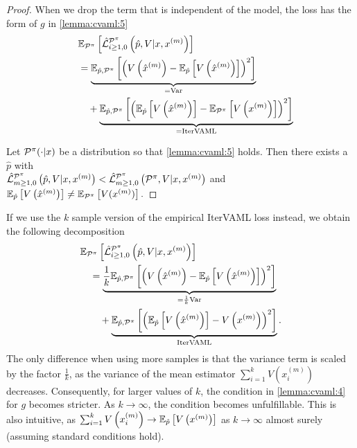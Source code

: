 \begin{proof}
When we drop the term that is independent of the model, the loss has the form of $g$ in \autoref{lemma:cvaml:5}
\begin{align}
   & \EEX{\P^\pi}{\hat{\mathcal{L}}^{\P^\pi}_{i\geq1,0}\left(\hat{p},V|x,x^{(m)}\right)} \\
   \quad & =  \underbrace{\EEX{\hat{p},\P^\pi}{\left(V\left(\hat{x}^{(m)}\right) - \EEX{\hat{p}}{V\left(\hat{x}^{(m)}\right)}\right)^2}}_{= \mathrm{Var}}  \\
   \quad & \quad +\underbrace{\EEX{\hat{p},\P^\pi}{\left(\EEX{\hat{p}}{V\left(\hat{x}^{(m)}\right)} - \EEX{\P^\pi}{V\left(x^{(m)}\right)}\right)^2}}_{= \mathrm{IterVAML}}
\end{align}

Let $\P^\pi(\cdot|x)$ be a distribution so that \autoref{lemma:cvaml:5} holds. 
Then there exists a $\hat{p}$ with \\$\hat{\mathcal{L}}^{\P^\pi}_{m\geq1,0}\left(\hat{p},V|x,x^{(m)}\right) < \hat{\mathcal{L}}^{\P^\pi}_{m\geq1,0}\left(\P^\pi,V|x,x^{(m)}\right)$ and $\EEX{\hat{p}}{V\left(\hat{x}^{(m)}\right)} \neq \EEX{\P^\pi}{V(x^{(m)})}.$
\end{proof}

If we use the $k$ sample version of the empirical IterVAML loss instead, we obtain the following decomposition
\begin{align}
    &\EEX{\P^\pi}{\hat{\mathcal{L}}^{\P^\pi}_{i\geq1,0}\left(\hat{p},V|x,x^{(m)}\right)} \\
    &\quad = \underbrace{\frac{1}{k}\EEX{\hat{p},\P^\pi}{\left(V\left(\hat{x}^{(m)}\right) - \EEX{\hat{p}}{V\left(\hat{x}^{(m)}\right)}\right)^2}}_{=\frac{1}{k} \mathrm{Var}} \\
    &\quad \quad + \underbrace{\EEX{\hat{p},\P^\pi}{\left(\EEX{\hat{p}}{V\left(\hat{x}^{(m)}\right)} - V\left(x^{(m)}\right)\right)^2}}_{\mathrm{IterVAML}}.
\end{align}
The only difference when using more samples is that the variance term is scaled by the factor $\frac{1}{k}$, as the variance of the mean estimator $\sum_{i=1}^k V\left(x^{(m)}_i\right)$ decreases.
Consequently, for larger values of $k$, the condition in \autoref{lemma:cvaml:4} for $g$ becomes stricter.
As $k \rightarrow \infty$, the condition becomes unfulfillable. 
This is also intuitive, as $\sum_{i=1}^k V\left(x^{(m)}_i\right) \rightarrow \EEX{\hat{p}}{V\left(x^{(m)}\right)}$ as $k \rightarrow \infty$ almost surely (assuming standard conditions hold).



